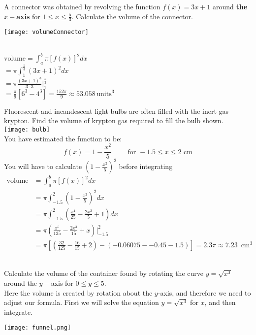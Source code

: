 \example A connector was obtained by revolving the function $f(x)={3x+1}$ around \textbf{the $x-$axis} for $1\leq x \leq \frac{5}{3}$. Calculate the volume of the connector.
\begin{multicols}{2}
\begin{center}\texttt{[image: volumeConnector]}\end{center}
\columnbreak
\solution\\ $\mathrm{volume}=\int_{a}^{b}\pi[f(x)]^2 dx$\medskip\\
$=\pi\int_{1}^{\frac{5}{3}}\left(3x+1\right)^2 dx$\medskip\\
$=\pi \frac{ (3x+1)^3}{3\cdot 3} \Big|_{1}^\frac{5}{3}$\medskip\\
$=\frac{\pi}{9}\left[6^3-4^3\right]=\frac{152\pi}{9}\approx 53.058\, \mathrm{units}^3$
\end{multicols}

\example Fluorescent and incandescent light bulbs are often filled with the inert gas krypton. Find the volume of krypton gas required to fill the bulb shown.\vspace{0.4cm}\\ 
\texttt{[image: bulb]}\\
You have estimated the function to be:\\
\[f(x)=1-\frac{x^2}{5}\qquad\text{ for } -1.5\leq x \leq 2\text{ cm}\] 
\solution You will have to calculate $\left(1-\frac{x^2}{5}\right)^2$ before integrating\\
	\begin{align*}
	\text{volume}&=\int_{a}^{b}\pi[f(x)]^2 dx\\
	&=\pi\int_{-1.5}^{2}\left(1-\frac{x^2}{5}\right)^2 dx\\
	&=\pi\int_{-1.5}^{2}\left(\frac{x^4}{25}-\frac{2x^2}{5}+1\right)dx\\
	&=\pi\left(\frac{x^5}{125}-\frac{2x^3}{15}+x\right)  \Bigg|_{-1.5}^2\\
	&=\pi\left[\left(\frac{32}{125}-\frac{16}{15}+2\right)-\left(-0.06075--0.45-1.5\right)\right]=2.3\pi\approx 7.23\, \text{ cm}^3\end{align*}
\\	
\begin{multicols}{2}
\examq Calculate the volume of the container found by rotating the curve $y=\sqrt{x^3}$ around the $y-$axis for $0\leq y \leq 5$.\\

Here the volume is created by rotation about the $y$-axis, and therefore we need to adjust our formula. First we will solve the equation $y=\sqrt{x^3}$ for $x$, and then integrate.
\columnbreak
\begin{center}
		\texttt{[image: funnel.png]}
\end{center}
\end{multicols}

